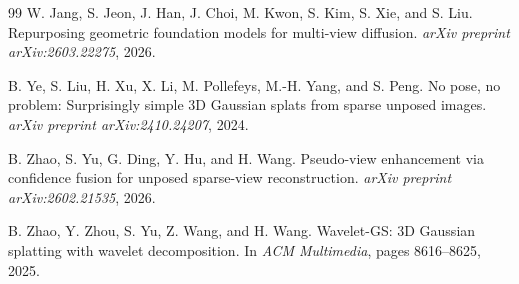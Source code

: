\documentclass[10pt,twocolumn,letterpaper]{article}
\begin{document}
\begin{thebibliography}{99}
W. Jang, S. Jeon, J. Han, J. Choi, M. Kwon, S. Kim, S. Xie, and S. Liu.
Repurposing geometric foundation models for multi-view diffusion.
\emph{arXiv preprint arXiv:2603.22275}, 2026.

B. Ye, S. Liu, H. Xu, X. Li, M. Pollefeys, M.-H. Yang, and S. Peng.
No pose, no problem: Surprisingly simple 3D Gaussian splats from sparse unposed images.
\emph{arXiv preprint arXiv:2410.24207}, 2024.

B. Zhao, S. Yu, G. Ding, Y. Hu, and H. Wang.
Pseudo-view enhancement via confidence fusion for unposed sparse-view reconstruction.
\emph{arXiv preprint arXiv:2602.21535}, 2026.

B. Zhao, Y. Zhou, S. Yu, Z. Wang, and H. Wang.
Wavelet-GS: 3D Gaussian splatting with wavelet decomposition.
In \emph{ACM Multimedia}, pages 8616--8625, 2025.
\end{thebibliography}
\end{document}
